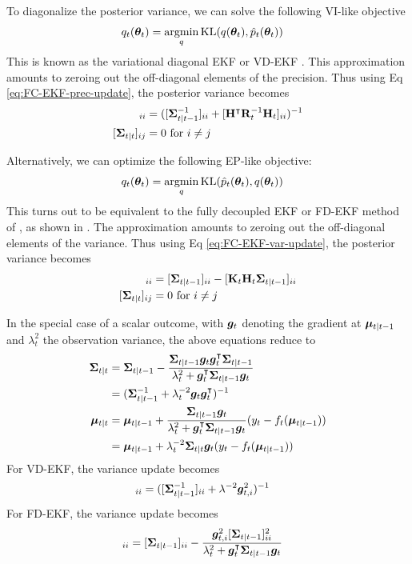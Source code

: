 To diagonalize the posterior variance, we can solve the following VI-like objective
\begin{align}
    q_t(\vtheta_t) &= \argmin_q \text{KL}(q(\vtheta_t), \hat{p}_t(\vtheta_t))
\end{align}
This is known as the variational diagonal EKF or VD-EKF \citep{Chang2022}. This approximation amounts to zeroing out the off-diagonal elements of the precision. Thus using Eq \eqref{eq:FC-EKF-prec-update}, the posterior variance becomes
\begin{align}
    [\vSigma_{t|t}]_{ii} &= ([\vSigma_{t\vert t-1}^{-1}]_{ii} + [\vH^\T \vR_t^{-1} \vH_t]_{ii})^{-1} \\
    [\vSigma_{t|t}]_{ij} &= 0 \text{ for $i\ne j$}
\end{align}

Alternatively, we can optimize the following EP-like objective:
\begin{align}
q_t(\vtheta_t)
 &= \argmin_q \text{KL}(\hat{p}_t(\vtheta_t),q(\vtheta_t))
\end{align}
This turns out to be equivalent to the fully decoupled EKF or FD-EKF method of \citep{Puskorius1991,Puskorius2003,Murtuza1994}, as shown in \citep{Chang2022}. The approximation amounts to zeroing out the off-diagonal elements of the variance. Thus using Eq \eqref{eq:FC-EKF-var-update}, the posterior variance becomes
\begin{align}
    [\vSigma_{t|t}]_{ii} &= [\vSigma_{t\vert t-1}]_{ii} - [\vK_t \vH_t \vSigma_{t\vert t-1}]_{ii} \\
    [\vSigma_{t|t}]_{ij} &= 0 \text{ for $i\ne j$}
\end{align}

In the special case of a scalar outcome, with ${\bm{g}}_t$ denoting the gradient at $\boldsymbol{\mu}_{t\vert t-1}$ and $\lambda_t^2$ the observation variance, the above equations reduce to
\begin{align}
    \boldsymbol{\Sigma}_{t|t} &= \boldsymbol{\Sigma}_{t\vert t-1} - \frac{\boldsymbol{\Sigma}_{t\vert t-1}{\bm{g}}_t{\bm{g}}_t^\intercal \boldsymbol{\Sigma}_{t\vert t-1}}{\lambda_t^2+{\bm{g}}_t^\intercal\boldsymbol{\Sigma}_{t\vert t-1}{\bm{g}}_t} \\
    &= (\boldsymbol{\Sigma}_{t\vert t-1}^{-1} + \lambda_t^{-2} {\bm{g}}_t {\bm{g}}_t^\intercal)^{-1} \\
    \boldsymbol{\mu}_{t\vert t} &= \boldsymbol{\mu}_{t\vert t-1} + \frac{\boldsymbol{\Sigma}_{t\vert t-1}{\bm{g}}_t}{\lambda_t^2+{\bm{g}}_t^\intercal\boldsymbol{\Sigma}_{t\vert t-1}{\bm{g}}_t} (y_t-f_t(\boldsymbol{\mu}_{t\vert t-1})) \\
    &= \boldsymbol{\mu}_{t\vert t-1} + \lambda_t^{-2} \boldsymbol{\Sigma}_{t\vert t} {\bm{g}}_t (y_t-f_t(\boldsymbol{\mu}_{t\vert t-1}))
\end{align}
For VD-EKF, the variance update becomes
\begin{align}
    [\vSigma_{t|t}]_{ii} &= ([\vSigma_{t\vert t-1}^{-1}]_{ii} + \lambda^{-2}\vg_{t,i}^2)^{-1}
\end{align}
For FD-EKF, the variance update becomes
\begin{align}
    [\vSigma_{t|t}]_{ii} &= [\vSigma_{t\vert t-1}]_{ii} - \frac{\vg_{t,i}^2[\vSigma_{t\vert t-1}]_{ii}^{2}}{\lambda_t^2+\vg_t^\T\vSigma_{t\vert t-1}\vg_t}
\end{align}

